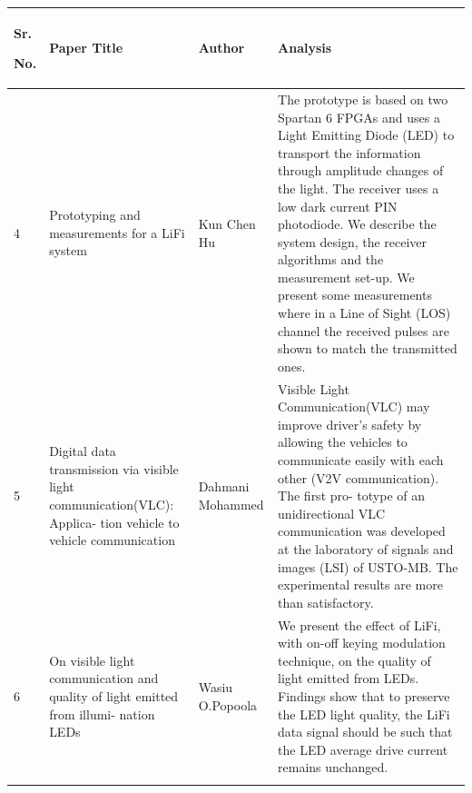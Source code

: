 \documentclass[12pt,a4paper]
{article}
\numberwithin{table}{section}
\begin{document}
{{{\begin{table}[htbp]
\begin{center}
\begin{tabular}{|p{25pt}|p{100pt}|p{85pt}|p{180pt}|}
\hline
\textbf{Sr.} \par \textbf{No. }\par & 
\textbf{Paper Title} \par & 
\textbf{Author} & 
\textbf{Analysis} \\
\hline
4&
Prototyping and measurements for a LiFi system &
Kun Chen Hu &
The prototype is based on two Spartan 6 FPGAs and uses a Light Emitting
Diode (LED) to transport the information through amplitude changes of the light.
The receiver uses a low dark current PIN photodiode. We describe the system design, the receiver
algorithms and the measurement set-up. We present some measurements where in a Line
of Sight (LOS) channel the received pulses are shown to match the transmitted ones.
\\
\hline
5&
Digital data transmission via visible light communication(VLC): Applica-
tion vehicle to vehicle communication &
Dahmani Mohammed &
Visible Light Communication(VLC) may improve driver's safety by allowing
the vehicles to communicate easily with each other (V2V communication). The first pro-
totype of an unidirectional VLC communication was developed at the laboratory of signals
and images (LSI) of USTO-MB. The experimental results are more than satisfactory.\\
\hline
6&
On visible light communication and quality of light emitted from illumi-
nation LEDs &
Wasiu O.Popoola &
We present the effect of LiFi, with on-off keying modulation technique, on
the quality of light emitted from LEDs. Findings show that to preserve the LED light
quality, the LiFi data signal should be such that the LED average drive current remains
unchanged.\\
\hline

\label{tab1}
\end{tabular}
\end{center}
\end{table}

\newpage











\newpage

}}}
\end{document}
